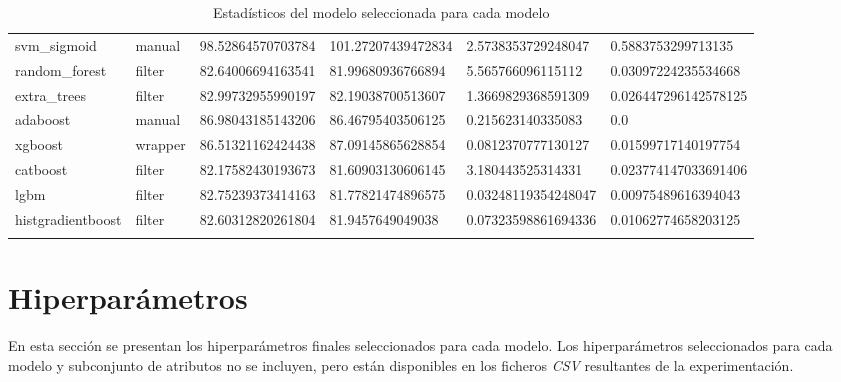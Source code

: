 {\begin{longtable}[c]{@{}llllll@{}}
	svm\_sigmoid         & manual               & 98.52864570703784 & 101.27207439472834 & 2.5738353729248047   & 0.5883753299713135   \\
	\rowcolor[HTML]{EFEFEF} 
	random\_forest       & filter               & 82.64006694163541 & 81.99680936766894  & 5.565766096115112    & 0.03097224235534668  \\
	extra\_trees         & filter               & 82.99732955990197 & 82.19038700513607  & 1.3669829368591309   & 0.026447296142578125 \\
	\rowcolor[HTML]{EFEFEF} 
	adaboost             & manual               & 86.98043185143206 & 86.46795403506125  & 0.215623140335083    & 0.0                  \\
	xgboost              & wrapper              & 86.51321162424438 & 87.09145865628854  & 0.0812370777130127   & 0.01599717140197754  \\
	\rowcolor[HTML]{EFEFEF} 
	catboost             & filter               & 82.17582430193673 & 81.60903130606145  & 3.180443525314331    & 0.023774147033691406 \\
	lgbm                 & filter               & 82.75239373414163 & 81.77821474896575  & 0.03248119354248047  & 0.00975489616394043  \\
	\rowcolor[HTML]{EFEFEF} 
	histgradientboost    & filter               & 82.60312820261804 & 81.9457649049038   & 0.07323598861694336  & 0.01062774658203125  \\* \bottomrule
	\caption{Estadísticos del modelo seleccionada para cada modelo}
	\label{tab:annexvalidation}\\
\end{longtable}}

\section{Hiperparámetros}

En esta sección se presentan los hiperparámetros finales seleccionados para cada modelo. Los hiperparámetros seleccionados para cada modelo y subconjunto de atributos no se incluyen, pero están disponibles en los ficheros \textit{CSV} resultantes de la experimentación.